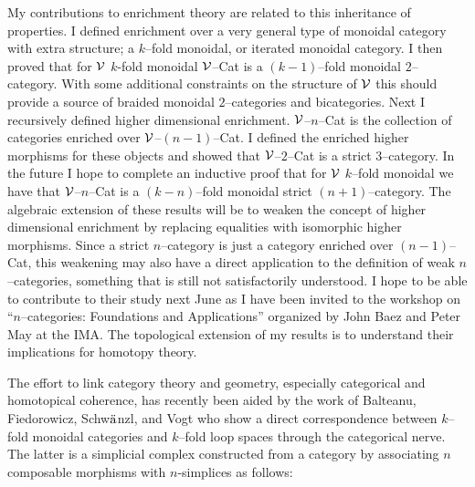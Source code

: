\documentclass[10pt]{article}
\newcommand{\MySection}[1]
{\noindent{\bf #1}}
\begin{document}
My contributions to enrichment theory are related to this inheritance of properties.
I defined enrichment over a very general type of monoidal category with
extra structure; a $k$--fold monoidal, or iterated monoidal category. I then proved that
for ${\cal V}$  $k$-fold monoidal ${\cal V}$--Cat is a $(k-1)$--fold monoidal $2$--category. With
some additional constraints on the structure of ${\cal V}$ this should provide a source of
braided monoidal $2$--categories and bicategories.
Next I recursively defined higher dimensional enrichment. ${\cal V}$--$n$--Cat is the collection
of categories enriched over ${\cal V}$--$(n-1)$--Cat. I defined the enriched higher morphisms
for these objects and showed that ${\cal V}$--$2$--Cat is a strict $3$--category. In the future
I hope to complete an inductive proof that for ${\cal V}$ $k$--fold monoidal we have that
${\cal V}$--$n$--Cat is a $(k-n)$--fold monoidal strict $(n+1)$--category.
 The algebraic extension of these results will be to weaken the concept of higher dimensional
 enrichment by replacing
 equalities with isomorphic higher morphisms. Since a strict $n$--category is just a category enriched
over $(n-1)$--Cat, this weakening may also have a direct application
    to the definition of weak $n$--categories, something that is still not
    satisfactorily understood. I hope to be able to contribute to their 
    study next June as I have been invited to the workshop on ``$n$--categories: Foundations
    and Applications'' organized by John Baez and Peter May at the IMA.
The topological extension of my results is to understand 
their implications for
homotopy theory. 

 \MySection{III. Enrichment and Delooping} 
 
 The effort to link category theory and geometry, especially categorical and homotopical coherence,
     has recently been aided by the work of Balteanu,
    Fiedorowicz, Schw${\rm \ddot a}$nzl, and Vogt
    who show a direct correspondence between $k$--fold monoidal
    categories and  $k$--fold loop spaces through the
    categorical nerve.\cite{Balt} The latter is a simplicial complex constructed from a category by
    associating $n$ composable morphisms with $n$-simplices as follows:
     
\end{document}
